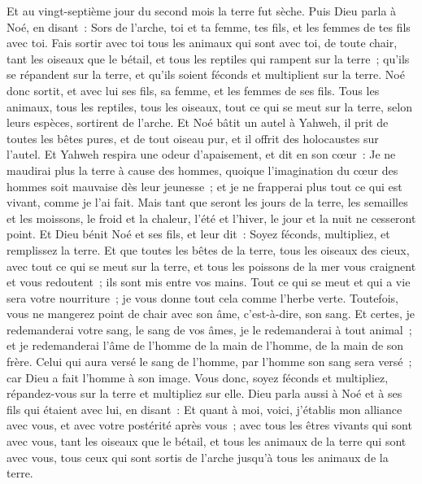 \begin{multicols}{2}
Et au vingt-septième jour du second mois la terre fut sèche.
Puis Dieu parla à Noé, en disant~:
Sors de l'arche, toi et ta femme, tes fils, et les femmes de tes fils avec toi.
Fais sortir avec toi tous les animaux qui sont avec toi, de toute chair, tant les oiseaux que le bétail, et tous les reptiles qui rampent sur la terre~; qu'ils se répandent sur la terre, et qu'ils soient féconds et multiplient sur la terre.
Noé donc sortit, et avec lui ses fils, sa femme, et les femmes de ses fils.
Tous les animaux, tous les reptiles, tous les oiseaux, tout ce qui se meut sur la terre, selon leurs espèces, sortirent de l'arche.
Et Noé bâtit un autel à Yahweh, il prit de toutes les bêtes pures, et de tout oiseau pur, et il offrit des holocaustes sur l'autel.
Et Yahweh respira une odeur d'apaisement, et dit en son cœur~: Je ne maudirai plus la terre à cause des hommes, quoique l'imagination du cœur des hommes soit mauvaise dès leur jeunesse~; et je ne frapperai plus tout ce qui est vivant, comme je l'ai fait.
Mais tant que seront les jours de la terre, les semailles et les moissons, le froid et la chaleur, l'été et l'hiver, le jour et la nuit ne cesseront point.
\VerseOne{}Et Dieu bénit Noé et ses fils, et leur dit~: Soyez féconds, multipliez, et remplissez la terre.
Et que toutes les bêtes de la terre, tous les oiseaux des cieux, avec tout ce qui se meut sur la terre, et tous les poissons de la mer vous craignent et vous redoutent~; ils sont mis entre vos mains.
Tout ce qui se meut et qui a vie sera votre nourriture~; je vous donne tout cela comme l'herbe verte.
Toutefois, vous ne mangerez point de chair avec son âme, c'est-à-dire, son sang.
Et certes, je redemanderai votre sang, le sang de vos âmes, je le redemanderai à tout animal~; et je redemanderai l'âme de l'homme de la main de l'homme, de la main de son frère.
Celui qui aura versé le sang de l'homme, par l'homme son sang sera versé~; car Dieu a fait l'homme à son image.
Vous donc, soyez féconds et multipliez, répandez-vous sur la terre et multipliez sur elle.
Dieu parla aussi à Noé et à ses fils qui étaient avec lui, en disant~:
Et quant à moi, voici, j'établis mon alliance avec vous, et avec votre postérité après vous~;
avec tous les êtres vivants qui sont avec vous, tant les oiseaux que le bétail, et tous les animaux de la terre qui sont avec vous, tous ceux qui sont sortis de l'arche jusqu'à tous les animaux de la terre.

\end{multicols}
